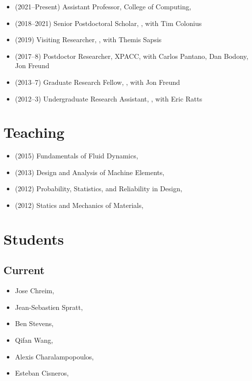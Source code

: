 \begin{itemize}
    \item (2021--Present) Assistant Professor, College of Computing, \GIT
    \item (2018--2021) Senior Postdoctoral Scholar, \CIT, with Tim Colonius
    \item (2019) Visiting Researcher, \MIT, with Themis Sapsis
    \item (2017--8) Postdoctor Researcher, XPACC, with Carlos Pantano, Dan Bodony, Jon Freund
    \item (2013--7) Graduate Research Fellow, \UIUC, with Jon Freund
    \item (2012--3) Undergraduate Research Assistant, \UMD, with Eric Ratts
\end{itemize}

\section{Teaching}

\begin{itemize}
    \item (2015) Fundamentals of Fluid Dynamics, \UIUC
    \item (2013) Design and Analysis of Machine Elements, \UMD
    \item (2012) Probability, Statistics, and Reliability in Design, \UMD
    \item (2012) Statics and Mechanics of Materials, \UMD
\end{itemize}


\section{Students}

\subsection{Current}

\begin{itemize}
    \item Jose Chreim, \CIT
    \item Jean-Sebastien Spratt, \CIT
    \item Ben Stevens, \CIT
    \item Qifan Wang, \CIT
    \item Alexis Charalampopoulos, \MIT
    \item Esteban Cisneros, \UIUC
\end{itemize}

